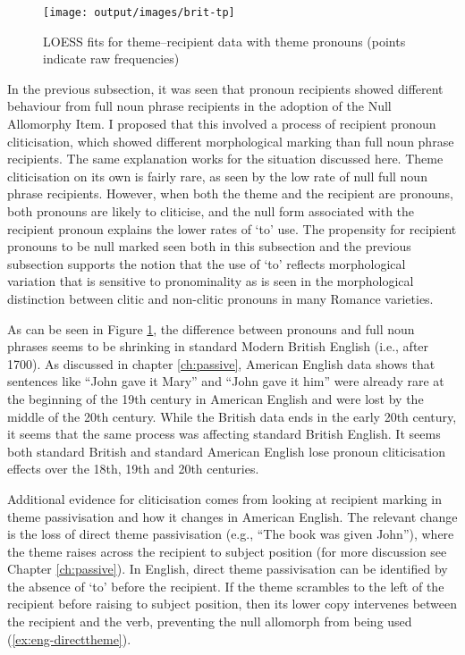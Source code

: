 	\begin{figure}[ht!]
		\texttt{[image: output/images/brit-tp]}
		\caption{LOESS fits for theme--recipient data with theme pronouns (points indicate raw frequencies)}
		\label{fig:brit-tp}
	\end{figure}

	In the previous subsection, it was seen that pronoun recipients showed different behaviour from full noun phrase recipients in the adoption of the Null Allomorphy Item. I proposed that this involved a process of recipient pronoun cliticisation, which showed different morphological marking than full noun phrase recipients. The same explanation works for the situation discussed here. Theme cliticisation on its own is fairly rare, as seen by the low rate of null full noun phrase recipients. However, when both the theme and the recipient are pronouns, both pronouns are likely to cliticise, and the null form associated with the recipient pronoun explains the lower rates of `to' use. The propensity for recipient pronouns to be null marked seen both in this subsection and the previous subsection supports the notion that the use of `to' reflects morphological variation that is sensitive to pronominality as is seen in the morphological distinction between clitic and non-clitic pronouns in many Romance varieties.

	As can be seen in Figure \ref{fig:brit-tp}, the difference between pronouns and full noun phrases seems to be shrinking in standard Modern British English (i.e., after 1700). As discussed in chapter \ref{ch:passive}, American English data shows that sentences like ``John gave it Mary'' and ``John gave it him'' were already rare at the beginning of the 19th century in American English and were lost by the middle of the 20th century. While the British data ends in the early 20th century, it seems that the same process was affecting standard British English. It seems both standard British and standard American English lose pronoun cliticisation effects over the 18th, 19th and 20th centuries.

	Additional evidence for cliticisation comes from looking at recipient marking in theme passivisation and how it changes in American English. The relevant change is the loss of direct theme passivisation (e.g., ``The book was given John''), where the theme raises across the recipient to subject position (for more discussion see Chapter \ref{ch:passive}). In English, direct theme passivisation can be identified by the absence of `to' before the recipient. If the theme scrambles to the left of the recipient before raising to subject position, then its lower copy intervenes between the recipient and the verb, preventing the null allomorph from being used (\ref{ex:eng-directtheme}).


